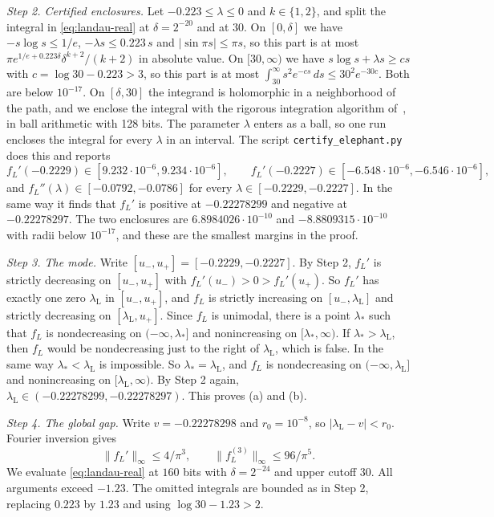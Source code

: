 \emph{Step 2. Certified enclosures.} Let $-0.223\le\lambda\le0$ and
$k\in\{1,2\}$, and split the integral in \eqref{eq:landau-real} at
$\delta=2^{-20}$ and at $30$. On $[0,\delta]$ we have $-s\log s\le1/e$,
$-\lambda s\le0.223\,s$ and $\lvert\sin\pi s\rvert\le\pi s$, so this part is
at most $\pi e^{1/e+0.223\delta}\delta^{k+2}/(k+2)$ in absolute value. On
$[30,\infty)$ we have $s\log s+\lambda s\ge cs$ with $c=\log30-0.223>3$, so
this part is at most
$\int_{30}^\infty s^2e^{-cs}\,ds\le30^2e^{-30c}$. Both are below $10^{-17}$. On
$[\delta,30]$ the integrand is holomorphic in a neighborhood of the path, and
we enclose the integral with the rigorous integration algorithm
of~\cite{johansson2018}, in ball arithmetic with 128 bits. The
parameter $\lambda$ enters as a ball, so one run encloses the integral for
every $\lambda$ in an interval. The script \texttt{certify\_elephant.py} does
this and reports
\[
 f_L'(-0.2229)\in[9.232\cdot10^{-6},9.234\cdot10^{-6}],\qquad
 f_L'(-0.2227)\in[-6.548\cdot10^{-6},-6.546\cdot10^{-6}],
\]
and $f_L''(\lambda)\in[-0.0792,-0.0786]$ for every
$\lambda\in[-0.2229,-0.2227]$. In the same way it finds that $f_L'$ is
positive at $-0.22278299$ and negative at $-0.22278297$. The two enclosures are
$6.8984026\cdot10^{-10}$ and $-8.8809315\cdot10^{-10}$ with radii below $10^{-17}$, and
these are the smallest margins in the proof.

\emph{Step 3. The mode.} Write $[u_-,u_+]=[-0.2229,-0.2227]$. By Step 2, $f_L'$
is strictly decreasing on $[u_-,u_+]$ with $f_L'(u_-)>0>f_L'(u_+)$. So $f_L'$ has
exactly one zero $\lambda_{\mathrm L}$ in $[u_-,u_+]$, and $f_L$ is strictly increasing on
$[u_-,\lambda_{\mathrm L}]$ and strictly decreasing on $[\lambda_{\mathrm L},u_+]$. Since $f_L$ is
unimodal, there is a point $\lambda_*$ such that $f_L$ is nondecreasing on
$(-\infty,\lambda_*]$ and nonincreasing on $[\lambda_*,\infty)$. If
$\lambda_*>\lambda_{\mathrm L}$, then $f_L$ would be nondecreasing just to the right of
$\lambda_{\mathrm L}$, which is false. In the same way $\lambda_*<\lambda_{\mathrm L}$ is
impossible. So $\lambda_*=\lambda_{\mathrm L}$, and $f_L$ is nondecreasing on
$(-\infty,\lambda_{\mathrm L}]$ and nonincreasing on $[\lambda_{\mathrm L},\infty)$. By Step 2 again,
$\lambda_{\mathrm L}\in(-0.22278299,-0.22278297)$. This proves (a) and (b).

\emph{Step 4. The global gap.} Write $v=-0.22278298$ and
$r_0=10^{-8}$, so $|\lambda_{\mathrm L}-v|<r_0$.
Fourier inversion gives
\[
 \|f_L'\|_\infty\le4/\pi^3,\qquad
 \|f_L^{(3)}\|_\infty\le96/\pi^5.
\]
We evaluate \eqref{eq:landau-real} at $160$ bits with
$\delta=2^{-24}$ and upper cutoff $30$. All arguments exceed $-1.23$.
The omitted integrals are bounded as in Step 2, replacing $0.223$
by $1.23$ and using $\log30-1.23>2$.

